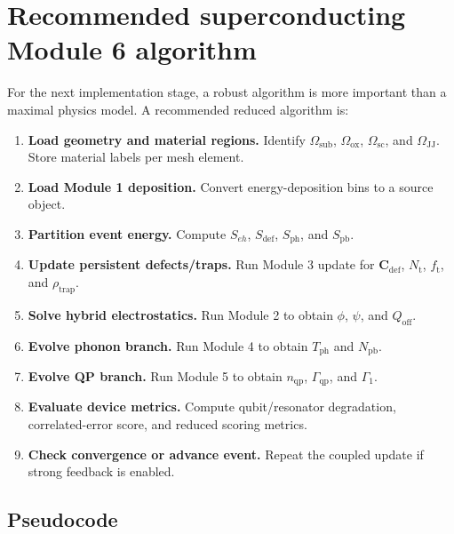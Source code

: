 \documentclass[11pt]{article}
\newcommand{\Osub}{\Omega_{\mathrm{sub}}}
\newcommand{\Oox}{\Omega_{\mathrm{ox}}}
\newcommand{\Osc}{\Omega_{\mathrm{sc}}}
\newcommand{\Ojj}{\Omega_{\mathrm{JJ}}}
\newcommand{\phiE}{\phi}
\newcommand{\Qoff}{Q_{\mathrm{off}}}
\newcommand{\wpot}{\psi}
\newcommand{\Cvec}{\bm{C}_{\mathrm{def}}}
\newcommand{\Nt}{N_{\mathrm{t}}}
\newcommand{\ft}{f_{\mathrm{t}}}
\newcommand{\Tph}{T_{\mathrm{ph}}}
\newcommand{\Npb}{N_{\mathrm{pb}}}
\newcommand{\nqp}{n_{\mathrm{qp}}}
\newcommand{\Gammaqp}{\Gamma_{\mathrm{qp}}}
\newcommand{\Gammaone}{\Gamma_1}
\begin{document}
\section{Recommended superconducting Module 6 algorithm}

For the next implementation stage, a robust algorithm is more important than a maximal physics model. A recommended reduced algorithm is:

\begin{enumerate}[leftmargin=2em]
\item \textbf{Load geometry and material regions.} Identify \(\Osub\), \(\Oox\), \(\Osc\), and \(\Ojj\). Store material labels per mesh element.
\item \textbf{Load Module 1 deposition.} Convert energy-deposition bins to a source object.
\item \textbf{Partition event energy.} Compute \(S_{eh}\), \(S_{\mathrm{def}}\), \(S_{\mathrm{ph}}\), and \(S_{\mathrm{pb}}\).
\item \textbf{Update persistent defects/traps.} Run Module 3 update for \(\Cvec\), \(\Nt\), \(\ft\), and \(\rho_{\mathrm{trap}}\).
\item \textbf{Solve hybrid electrostatics.} Run Module 2 to obtain \(\phiE\), \(\wpot\), and \(\Qoff\).
\item \textbf{Evolve phonon branch.} Run Module 4 to obtain \(\Tph\) and \(\Npb\).
\item \textbf{Evolve QP branch.} Run Module 5 to obtain \(\nqp\), \(\Gammaqp\), and \(\Gammaone\).
\item \textbf{Evaluate device metrics.} Compute qubit/resonator degradation, correlated-error score, and reduced scoring metrics.
\item \textbf{Check convergence or advance event.} Repeat the coupled update if strong feedback is enabled.
\end{enumerate}

\subsection{Pseudocode}
\end{document}
